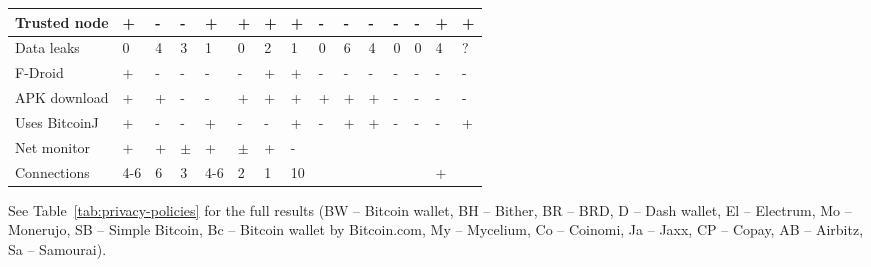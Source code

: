 \begin{table*}
\begin{tabular}{| l | l l l l l l l | l l l l l l l |}
	\hline
	Trusted node & + & - & - & + & + & + & + & - & - & - & - & - & + & + \\
	\hline
	Data leaks & 0 & 4 & 3 & 1 & 0 & 2 & 1 & 0 & 6 & 4 & 0 & 0 & 4 & ? \\
	F-Droid & + & - & - & - & - & + & + & - & - & - & - & - & - & - \\
	APK download & + & + & - & - & + & + & + & + & + & + & - & - & - & - \\
	Uses BitcoinJ & + & - & - & + & - & - & + & - & + & + & - & - & - & + \\
	Net monitor & + & + & $\pm$ & + & $\pm$ & + & - &  &  &  &  &  &  &  \\
	Connections & 4-6 & 6 & 3 & 4-6 & 2 & 1 & 10 &  &  &  &  &  & + &  \\
	\hline
\end{tabular}
\label{tab:privacy-policies}
\end{table*}

See Table~\ref{tab:privacy-policies} for the full results (BW -- Bitcoin wallet, BH -- Bither, BR -- BRD, D -- Dash wallet, El -- Electrum, Mo -- Monerujo, SB -- Simple Bitcoin, Bc -- Bitcoin wallet by Bitcoin.com, My -- Mycelium, Co -- Coinomi, Ja -- Jaxx, CP -- Copay, AB -- Airbitz, Sa -- Samourai).


